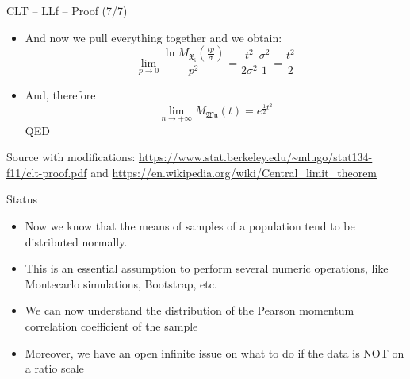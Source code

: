 \documentclass{beamer}
\begin{document}
\begin{frame}
{\centerline{CLT -- LLf -- Proof (7/7)}}

\begin{itemize}
\item And now we pull everything together and we obtain:
$$\lim_{p \to 0} \frac{\ln M_\mathfrak{X_i}(\frac{tp}{\sigma})}{p^2} = \frac{t^2}{2\sigma^2} \frac{\sigma^2}{1} = \frac{t^2}{2} $$
\item And, therefore
$$\lim_{n \to + \infty} M_\mathfrak{Wn}(t) = e ^{\frac{1}{2}t^2}$$
QED
\end{itemize}

\begin{center}
\tiny 
Source with modifications: \url{https://www.stat.berkeley.edu/~mlugo/stat134-f11/clt-proof.pdf} and \url{https://en.wikipedia.org/wiki/Central_limit_theorem}
\end{center}
\end{frame}



\begin{frame}
{\centerline{Status}}

\begin{itemize}
\item Now we know that the means of samples of a population tend to be distributed normally.
\item This is an essential assumption to perform several numeric operations, like Montecarlo simulations, Bootstrap, etc.
\item We can now understand the distribution of the Pearson momentum correlation coefficient of the sample
\item Moreover, we have an open infinite issue on what to do if the data is NOT on a ratio scale
\end{itemize}


\end{frame}
\end{document}
